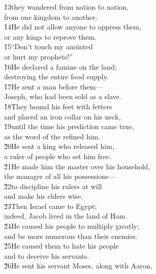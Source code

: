 \begin{poetry}
\poeml \v{13}they wandered from nation to nation, \\
\poemll    from one kingdom to another. \\
\poeml \v{14}He did not allow anyone to oppress them, \\
\poemll    or any kings to reprove them. \\
\poeml \v{15}``Don't touch my anointed \\
\poemll    or hurt my prophets!'' \\
\poeml \v{16}He declared a famine on the land; \\
\poemll    destroying the entire food supply. \\
\poeml \v{17}He sent a man before them--- \\
\poemll    Joseph, who had been sold as a slave. \\
\poeml \v{18}They bound his feet with fetters \\
\poemll    and placed an iron collar on his neck, \\
\poeml \v{19}until the time his prediction came true, \\
\poemll    as the word of the  refined him. \\
\poeml \v{20}He sent a king who released him, \\
\poemll    a ruler of people who set him free. \\
\poeml \v{21}He made him the master over his household, \\
\poemll    the manager of all his possessions--- \\
\poeml \v{22}to discipline his rulers at will \\
\poemll    and make his elders wise. \\
\poeml \v{23}Then Israel came to Egypt; \\
\poemll    indeed, Jacob lived in the land of Ham. \\
\poeml \v{24}He caused his people to multiply greatly; \\
\poemll    and be more numerous than their enemies. \\
\poeml \v{25}He caused them to hate his people \\
\poemll    and to deceive his servants. \\
\poeml \v{26}He sent his servant Moses, along with Aaron, \\

\end{poetry}
